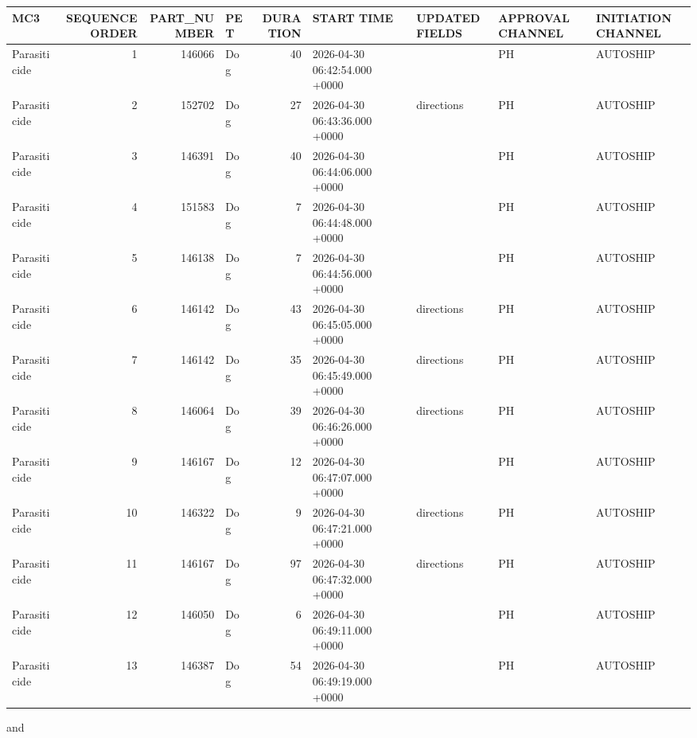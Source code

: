 \documentclass[
]{article}
\newcounter{none} %
\begin{document}
{\def\LTcaptype{none} %
\begin{longtable}[]{@{}lrrlrllll@{}}
\toprule\noalign{}
MC3 & SEQUENCE ORDER & PART\_NUMBER & PET & DURATION & START TIME &
UPDATED FIELDS & APPROVAL CHANNEL & INITIATION CHANNEL \\
\midrule\noalign{}
\endhead
\bottomrule\noalign{}
\endlastfoot
Parasiticide & 1 & 146066 & Dog & 40 & 2026-04-30 06:42:54.000 +0000 & &
PH & AUTOSHIP \\
Parasiticide & 2 & 152702 & Dog & 27 & 2026-04-30 06:43:36.000 +0000 &
directions & PH & AUTOSHIP \\
Parasiticide & 3 & 146391 & Dog & 40 & 2026-04-30 06:44:06.000 +0000 & &
PH & AUTOSHIP \\
Parasiticide & 4 & 151583 & Dog & 7 & 2026-04-30 06:44:48.000 +0000 & &
PH & AUTOSHIP \\
Parasiticide & 5 & 146138 & Dog & 7 & 2026-04-30 06:44:56.000 +0000 & &
PH & AUTOSHIP \\
Parasiticide & 6 & 146142 & Dog & 43 & 2026-04-30 06:45:05.000 +0000 &
directions & PH & AUTOSHIP \\
Parasiticide & 7 & 146142 & Dog & 35 & 2026-04-30 06:45:49.000 +0000 &
directions & PH & AUTOSHIP \\
Parasiticide & 8 & 146064 & Dog & 39 & 2026-04-30 06:46:26.000 +0000 &
directions & PH & AUTOSHIP \\
Parasiticide & 9 & 146167 & Dog & 12 & 2026-04-30 06:47:07.000 +0000 & &
PH & AUTOSHIP \\
Parasiticide & 10 & 146322 & Dog & 9 & 2026-04-30 06:47:21.000 +0000 &
directions & PH & AUTOSHIP \\
Parasiticide & 11 & 146167 & Dog & 97 & 2026-04-30 06:47:32.000 +0000 &
directions & PH & AUTOSHIP \\
Parasiticide & 12 & 146050 & Dog & 6 & 2026-04-30 06:49:11.000 +0000 & &
PH & AUTOSHIP \\
Parasiticide & 13 & 146387 & Dog & 54 & 2026-04-30 06:49:19.000 +0000 &
& PH & AUTOSHIP \\
\end{longtable}
}

and
\end{document}
